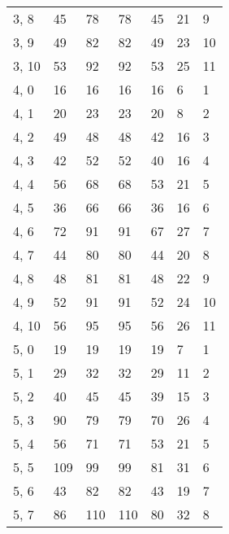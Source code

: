 \begin{table}
\begin{tabular}{lllllll}
3, 8   &         45 &          78 &        78 &          45 &       21 &     9 \\
3, 9   &         49 &          82 &        82 &          49 &       23 &    10 \\
3, 10  &         53 &          92 &        92 &          53 &       25 &    11 \\
4, 0   &         16 &          16 &        16 &          16 &        6 &     1 \\
4, 1   &         20 &          23 &        23 &          20 &        8 &     2 \\
4, 2   &         49 &          48 &        48 &          42 &       16 &     3 \\
4, 3   &         42 &          52 &        52 &          40 &       16 &     4 \\
4, 4   &         56 &          68 &        68 &          53 &       21 &     5 \\
4, 5   &         36 &          66 &        66 &          36 &       16 &     6 \\
4, 6   &         72 &          91 &        91 &          67 &       27 &     7 \\
4, 7   &         44 &          80 &        80 &          44 &       20 &     8 \\
4, 8   &         48 &          81 &        81 &          48 &       22 &     9 \\
4, 9   &         52 &          91 &        91 &          52 &       24 &    10 \\
4, 10  &         56 &          95 &        95 &          56 &       26 &    11 \\
5, 0   &         19 &          19 &        19 &          19 &        7 &     1 \\
5, 1   &         29 &          32 &        32 &          29 &       11 &     2 \\
5, 2   &         40 &          45 &        45 &          39 &       15 &     3 \\
5, 3   &         90 &          79 &        79 &          70 &       26 &     4 \\
5, 4   &         56 &          71 &        71 &          53 &       21 &     5 \\
5, 5   &        109 &          99 &        99 &          81 &       31 &     6 \\
5, 6   &         43 &          82 &        82 &          43 &       19 &     7 \\
5, 7   &         86 &         110 &       110 &          80 &       32 &     8 \\

\end{tabular}
\end{table}
